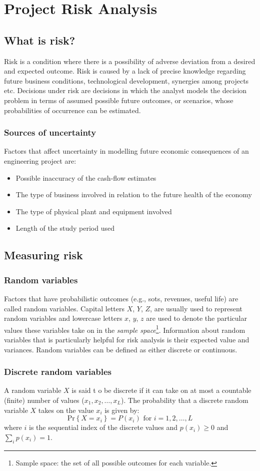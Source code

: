 \chapter{Project Risk Analysis}
\section{What is risk?}
Risk is a condition where there is a possibility of adverse deviation from a desired and expected outcome. Risk is caused by a lack of precise knowledge regarding future business conditions, technological development, synergies among projects etc. Decisions under risk are decisions in which the analyst models the decision problem in terms of assumed possible future outcomes, or scenarios, whose probabilities of occurrence can be estimated.
\subsection{Sources of uncertainty}
Factors that affect uncertainty in modelling future economic consequences of an engineering project are:
\begin{itemize}
    \item Possible inaccuracy of the cash-flow estimates
    \item The type of business involved in relation to the future health of the economy
    \item The type of physical plant and equipment involved
    \item Length of the study period used
\end{itemize}
\section{Measuring risk}
\subsection{Random variables}
Factors that have probabilistic outcomes (e.g., sots, revenues, useful life) are called random variables. Capital letters $X$, $Y$, $Z$, are usually used to represent random variables and lowercase letters $x$, $y$, $z$ are used to denote the particular values these variables take on in the \textit{sample space}\footnote{Sample space: the set of all possible outcomes for each variable.}. Information about random variables that is particularly helpful for risk analysis is their expected value and variances. Random variables can be defined as either discrete or continuous.
\subsection{Discrete random variables}
A random variable $X$ is said t o be discrete if it can take on at most a countable (finite) number of values ($x_1, x_2, \dots, x_L$). The probability that a discrete random variable $X$ takes on the value $x_i$ is given by:
\begin{equation}
    \textrm{Pr} \left\{X = x_i \right\} = P\left(x_i\right) \textrm{ for } i = 1,2,\dots , L
\end{equation}
where $i$ is the sequential index of the discrete values and $p\left(x_i\right) \geq 0$ and $\sum_i p\left(x_i\right) = 1$.

